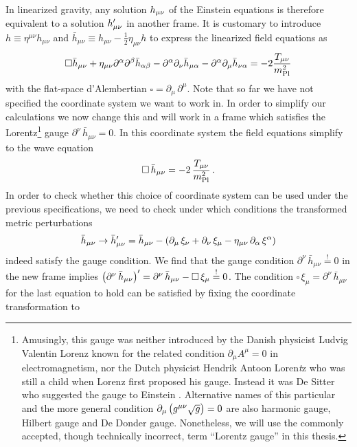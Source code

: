 In linearized gravity, any solution $h_{{\mu \nu}}$ of the Einstein equations is therefore equivalent to a solution $h_{{\mu \nu}}^\prime$ in another frame. It is customary to introduce $h \equiv \eta^{\mu \nu} h_{\mu \nu}$ and $\bar{h}_{\mu \nu} \equiv h_{\mu \nu} - \frac{1}{2} \eta_{\mu \nu} h$  to express the linearized field equations as
\begin{align}
	\square \bar{h}_{\mu \nu} +  \eta_{\mu \nu} \partial^\alpha \partial^\beta \bar{h}_{\alpha \beta} - \partial^\alpha  \partial_\nu \bar{h}_{\mu \alpha} - \partial^\alpha \partial_\mu \bar{h}_{\nu \alpha}   = - 2\frac{ T_{\mu \nu}}{m_\text{Pl}^2}
\end{align}
with the flat-space d'Alembertian $\square = \partial_\mu \, \partial^\mu$. Note that so far we have not specified the coordinate system we want to work in. In order to simplify   our calculations we now change this and will work in a frame which satisfies the Lorentz\footnote{Amusingly, this gauge was neither introduced by the Danish physicist Ludvig Valentin Lorenz known for the related condition $\partial_\mu A^\mu = 0$ in electromagnetism, nor the Dutch physicist Hendrik Antoon Loren\textit{t}z who was still a child when Lorenz first proposed his gauge. Instead it was De Sitter who suggested the gauge to Einstein  \cite{Kennefick2007}. Alternative names of this particular and the more general condition $\partial_\mu \left( g^{\mu \nu} \sqrt{g} \right) = 0$ are also harmonic gauge, Hilbert gauge and De Donder gauge. Nonetheless, we will use the commonly accepted, though technically incorrect, term ``Lorentz gauge'' in this thesis.}  gauge $\partial^\nu \, \bar{h}_{\mu \nu} = 0$. In this coordinate system the field equations simplify to the wave equation
\begin{align}
	\square \,\bar{h}_{\mu \nu}  = -2  \, \frac{T_{\mu \nu}}{m_\text{Pl}^2} \, . 
	\label{eq:GW}
\end{align}
In order to check whether this choice of coordinate system can be used under the previous specifications, we need to check under which conditions the transformed metric perturbations
\begin{align}
	\bar{h}_{\mu \nu} \rightarrow  \bar{h}_{\mu \nu}^\prime = \bar{h}_{\mu \nu} - \left( \partial_\mu \, \xi_\nu + \partial_\nu \, \xi_\mu - \eta_{\mu \nu} \, \partial_\alpha \, \xi^\alpha \right) 
	\label{eq:hbarcoordinatechange}
\end{align}
indeed   satisfy the gauge condition. We find that the gauge condition $\partial^\nu \, \bar{h}_{\mu \nu} \overset{!}{=} 0$ in the new frame implies $\left( \partial^\nu \, \bar{h}_{\mu \nu} \right)^\prime = \partial^\nu \, \bar{h}_{\mu \nu} - \square \, \xi_\mu \overset{!}{=}0$. The condition $\square \, \xi_\mu = \partial^\nu \, \bar{h}_{\mu \nu}$ for the last equation to hold can be satisfied by fixing the coordinate transformation to
